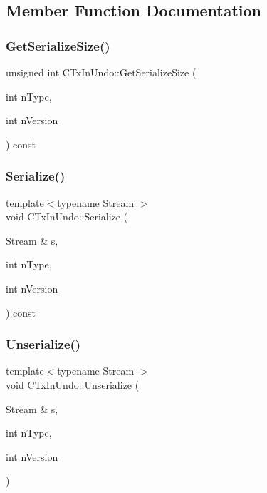 \subsection{Member Function Documentation}
\mbox{\label{class_c_tx_in_undo_ae02e42aeabd614a26ba5657f60ec6921}} 
\subsubsection{\texorpdfstring{Get\+Serialize\+Size()}{GetSerializeSize()}}
{\footnotesize\ttfamily unsigned int C\+Tx\+In\+Undo\+::\+Get\+Serialize\+Size (\begin{DoxyParamCaption}\item[{int}]{n\+Type,  }\item[{int}]{n\+Version }\end{DoxyParamCaption}) const\hspace{0.3cm}{\ttfamily [inline]}}

\mbox{\label{class_c_tx_in_undo_a7a4e1cf026b5308fdca471bada9cebaf}} 
\subsubsection{\texorpdfstring{Serialize()}{Serialize()}}
{\footnotesize\ttfamily template$<$typename Stream $>$ \\
void C\+Tx\+In\+Undo\+::\+Serialize (\begin{DoxyParamCaption}\item[{Stream \&}]{s,  }\item[{int}]{n\+Type,  }\item[{int}]{n\+Version }\end{DoxyParamCaption}) const\hspace{0.3cm}{\ttfamily [inline]}}

\mbox{\label{class_c_tx_in_undo_a0a2b82f03edad7ad85a66e63e4552af9}} 
\subsubsection{\texorpdfstring{Unserialize()}{Unserialize()}}
{\footnotesize\ttfamily template$<$typename Stream $>$ \\
void C\+Tx\+In\+Undo\+::\+Unserialize (\begin{DoxyParamCaption}\item[{Stream \&}]{s,  }\item[{int}]{n\+Type,  }\item[{int}]{n\+Version }\end{DoxyParamCaption})\hspace{0.3cm}{\ttfamily [inline]}}



